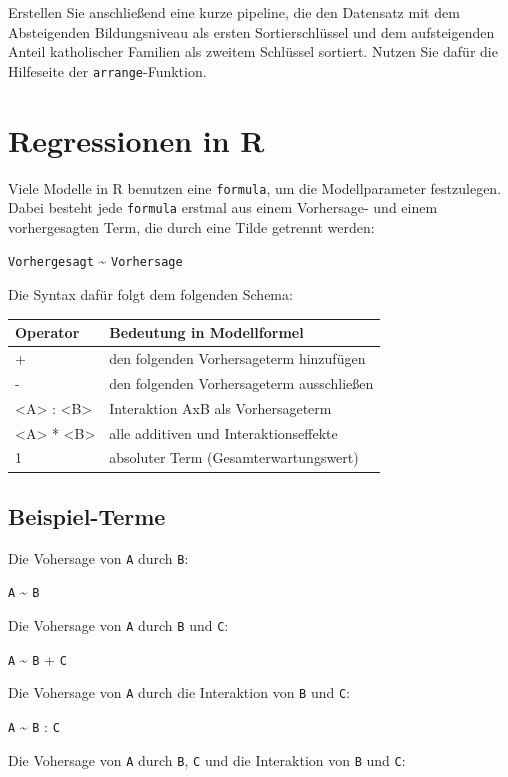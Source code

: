 \documentclass[
]{book}
\begin{document}
Erstellen Sie anschließend eine kurze pipeline, die den Datensatz mit dem Absteigenden Bildungsniveau als ersten Sortierschlüssel und dem aufsteigenden Anteil katholischer Familien als zweitem Schlüssel sortiert. Nutzen Sie dafür die Hilfeseite der \texttt{arrange}-Funktion.

\hypertarget{regressionen-in-r}{%
\section{Regressionen in R}\label{regressionen-in-r}}

Viele Modelle in R benutzen eine \texttt{formula}, um die Modellparameter festzulegen.
Dabei besteht jede \texttt{formula} erstmal aus einem Vorhersage- und einem vorhergesagten Term, die durch eine Tilde getrennt werden:

\texttt{Vorhergesagt} \textasciitilde{} \texttt{Vorhersage}

Die Syntax dafür folgt dem folgenden Schema:

\begin{longtable}[]{@{}ll@{}}
\toprule
Operator & Bedeutung in Modellformel\tabularnewline
\midrule
\endhead
+ & den folgenden Vorhersageterm hinzufügen\tabularnewline
- & den folgenden Vorhersageterm ausschließen\tabularnewline
\textless A\textgreater{} : \textless B\textgreater{} & Interaktion AxB als Vorhersageterm\tabularnewline
\textless A\textgreater{} * \textless B\textgreater{} & alle additiven und Interaktionseffekte\tabularnewline
1 & absoluter Term (Gesamterwartungswert)\tabularnewline
\bottomrule
\end{longtable}

\hypertarget{beispiel-terme}{%
\subsection{Beispiel-Terme}\label{beispiel-terme}}

Die Vohersage von \texttt{A} durch \texttt{B}:

\texttt{A} \textasciitilde{} \texttt{B}

Die Vohersage von \texttt{A} durch \texttt{B} und \texttt{C}:

\texttt{A} \textasciitilde{} \texttt{B} + \texttt{C}

Die Vohersage von \texttt{A} durch die Interaktion von \texttt{B} und \texttt{C}:

\texttt{A} \textasciitilde{} \texttt{B} : \texttt{C}

Die Vohersage von \texttt{A} durch \texttt{B}, \texttt{C} und die Interaktion von \texttt{B} und \texttt{C}:
\end{document}

